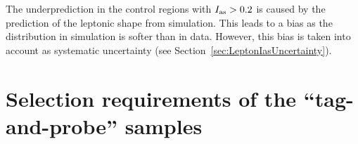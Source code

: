 \newpage 
The underprediction in the control regions with $I_{\text{as}}>0.2$ is caused by the prediction of the leptonic \ias shape from simulation.
This leads to a bias as the \ias distribution in simulation is softer than in data.
However, this bias is taken into account as systematic uncertainty (see Section~\ref{sec:LeptonIasUncertainty}).


\clearpage
\section{Selection requirements of the ``tag-and-probe'' samples}
\label{app:TagAndProbeRequirements}

